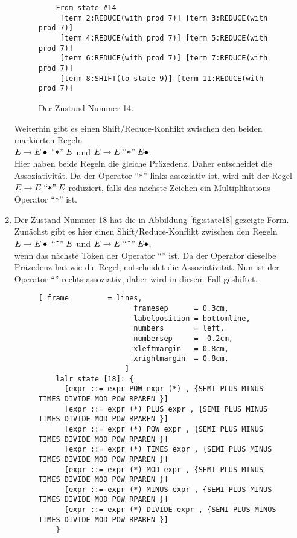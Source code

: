 \begin{enumerate}
\begin{figure}[!ht]
\begin{Verbatim}
    From state #14
     [term 2:REDUCE(with prod 7)] [term 3:REDUCE(with prod 7)]
     [term 4:REDUCE(with prod 7)] [term 5:REDUCE(with prod 7)]
     [term 6:REDUCE(with prod 7)] [term 7:REDUCE(with prod 7)]
     [term 8:SHIFT(to state 9)] [term 11:REDUCE(with prod 7)]
    \end{Verbatim} 
    \vspace*{-0.3cm}
    \caption{Der Zustand Nummer 14.}
    \label{fig:state14}
  \end{figure}
      Weiterhin gibt es einen Shift/Reduce-Konflikt zwischen den beiden markierten Regeln
      \\[0.2cm]
      \hspace*{1.3cm}
      $E \rightarrow E \bullet \;\mbox{``\texttt{*}''}\; E$ \quad und \quad
      $E \rightarrow E \;\mbox{``\texttt{*}''}\; E \bullet$.
      \\[0.2cm]
      Hier haben beide Regeln die gleiche Pr\"azedenz.  Daher entscheidet die  Assoziativit\"at.
      Da der Operator ``\texttt{*}'' links-assoziativ ist, wird mit der Regel
      $E \rightarrow E \;\mbox{``\texttt{*}''}\; E$ reduziert, falls das n\"achste Zeichen ein Multiplikations-Operator
      ``\texttt{*}'' ist.
\item Der Zustand Nummer 18 hat die in Abbildung \ref{fig:state18} gezeigte Form.
      Zun\"achst gibt es hier einen Shift/Reduce-Konflikt zwischen den Regeln
      \\[0.2cm]
      \hspace*{1.3cm}
      $E \rightarrow E \bullet \quoted{\symbol{94}} E$ \quad und \quad
      $E \rightarrow E \quoted{\symbol{94}} E  \bullet$,
      \\[0.2cm]
      wenn das n\"achste Token der Operator ``\texttt{}'' ist.  Da der Operator 
      dieselbe Pr\"azedenz 
      hat wie die Regel, entscheidet die Assoziativit\"at.  Nun ist der Operator
      ``\texttt{}'' rechts-assoziativ, daher wird in diesem Fall geshiftet.

    \begin{figure}[!ht]
    \centering
    \begin{Verbatim}[ frame         = lines, 
                      framesep      = 0.3cm, 
                      labelposition = bottomline,
                      numbers       = left,
                      numbersep     = -0.2cm,
                      xleftmargin   = 0.8cm,
                      xrightmargin  = 0.8cm,
                    ]
    lalr_state [18]: {
      [expr ::= expr POW expr (*) , {SEMI PLUS MINUS TIMES DIVIDE MOD POW RPAREN }]
      [expr ::= expr (*) PLUS expr , {SEMI PLUS MINUS TIMES DIVIDE MOD POW RPAREN }]
      [expr ::= expr (*) POW expr , {SEMI PLUS MINUS TIMES DIVIDE MOD POW RPAREN }]
      [expr ::= expr (*) TIMES expr , {SEMI PLUS MINUS TIMES DIVIDE MOD POW RPAREN }]
      [expr ::= expr (*) MOD expr , {SEMI PLUS MINUS TIMES DIVIDE MOD POW RPAREN }]
      [expr ::= expr (*) MINUS expr , {SEMI PLUS MINUS TIMES DIVIDE MOD POW RPAREN }]
      [expr ::= expr (*) DIVIDE expr , {SEMI PLUS MINUS TIMES DIVIDE MOD POW RPAREN }]
    }


\end{Verbatim}
\end{figure}
\end{enumerate}
